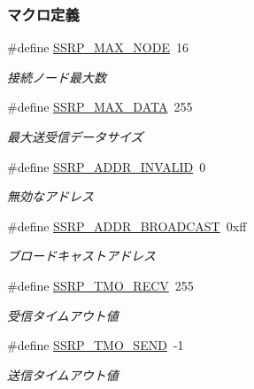 \subsubsection*{マクロ定義}
\begin{DoxyCompactItemize}
\item 
\#define \hyperlink{ssrp_8h_af88c2fe13b4e079ac20a99bf959efccc_af88c2fe13b4e079ac20a99bf959efccc}{S\+S\+R\+P\+\_\+\+M\+A\+X\+\_\+\+N\+O\+D\+E}~16
\begin{DoxyCompactList}\small\item\em 接続ノード最大数 \end{DoxyCompactList}\item 
\#define \hyperlink{ssrp_8h_a6fd9568ebb3f45fd9b531322c2aa7cfd_a6fd9568ebb3f45fd9b531322c2aa7cfd}{S\+S\+R\+P\+\_\+\+M\+A\+X\+\_\+\+D\+A\+T\+A}~255
\begin{DoxyCompactList}\small\item\em 最大送受信データサイズ \end{DoxyCompactList}\item 
\#define \hyperlink{ssrp_8h_ac544437b8b63638505e1bb111063d56a_ac544437b8b63638505e1bb111063d56a}{S\+S\+R\+P\+\_\+\+A\+D\+D\+R\+\_\+\+I\+N\+V\+A\+L\+I\+D}~0
\begin{DoxyCompactList}\small\item\em 無効なアドレス \end{DoxyCompactList}\item 
\#define \hyperlink{ssrp_8h_a45cf2a260877004832aef2829f84d90d_a45cf2a260877004832aef2829f84d90d}{S\+S\+R\+P\+\_\+\+A\+D\+D\+R\+\_\+\+B\+R\+O\+A\+D\+C\+A\+S\+T}~0xff
\begin{DoxyCompactList}\small\item\em ブロードキャストアドレス \end{DoxyCompactList}\item 
\#define \hyperlink{ssrp_8h_a8ab83c225d7e98ee20fecf775e415082_a8ab83c225d7e98ee20fecf775e415082}{S\+S\+R\+P\+\_\+\+T\+M\+O\+\_\+\+R\+E\+C\+V}~255
\begin{DoxyCompactList}\small\item\em 受信タイムアウト値 \end{DoxyCompactList}\item 
\#define \hyperlink{ssrp_8h_a4ebcd371d2939b092bcf3669f8516dbd_a4ebcd371d2939b092bcf3669f8516dbd}{S\+S\+R\+P\+\_\+\+T\+M\+O\+\_\+\+S\+E\+N\+D}~-\/1
\begin{DoxyCompactList}\small\item\em 送信タイムアウト値 \end{DoxyCompactList}\item 

\end{DoxyCompactItemize}
